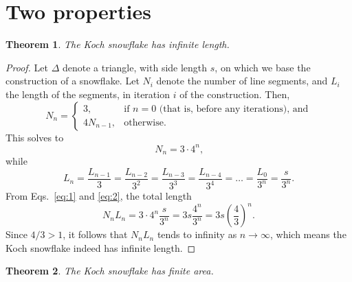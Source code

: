 \documentclass[12pt,a4paper]{article}
\newtheorem{theorem}{Theorem}
\begin{document}
\section{Two properties}
\begin{theorem} 
    The Koch snowflake has infinite length.
\end{theorem}
\begin{proof}
    Let $\Delta$ denote a triangle, with side length 
    $s$, on which we base the construction
    of a snowflake. 
    Let $N_i$ denote the number of line segments, and
    $L_i$ the length of the
    segments, in iteration $i$ of the construction. 
    Then,
    \begin{displaymath}
    N_n = 
    \begin{cases}
        3, &\text{if } n = 0 \text{ (that is, before any iterations), and}\\
        4N_{n-1}, &\text{otherwise.}
    \end{cases}
    \end{displaymath}
This solves to
\begin{equation}
    \label{eq:1}
    N_n=3\cdot4^n\text{,}
\end{equation}
while
\begin{equation}
    \label{eq:2}
    L_n=\frac{L_{n-1}}{3}=\frac{L_{n-2}}{3^2}=
    \frac{L_{n-3}}{3^3}=\frac{L_{n-4}}{3^4}=\ldots
    =\frac{L_0}{3^n}=\frac{s}{3^n}\text{.}
\end{equation}
From Eqs.~\ref{eq:1} and \ref{eq:2}, the total length
\begin{displaymath}
    N_nL_n=3\cdot4^n\frac{s}{3^n}=3s\frac{4^n}{3^n}=3s\left(\frac{4}{3}\right)^n\text{.}
\end{displaymath}
Since $4/3 > 1$, it follows that $N_nL_n$ tends to infinity as $n \to \infty$, which means the Koch
snowflake indeed has infinite length.
\end{proof}
\begin{theorem}
    The Koch snowflake has finite area.
\end{theorem}
\end{document}
